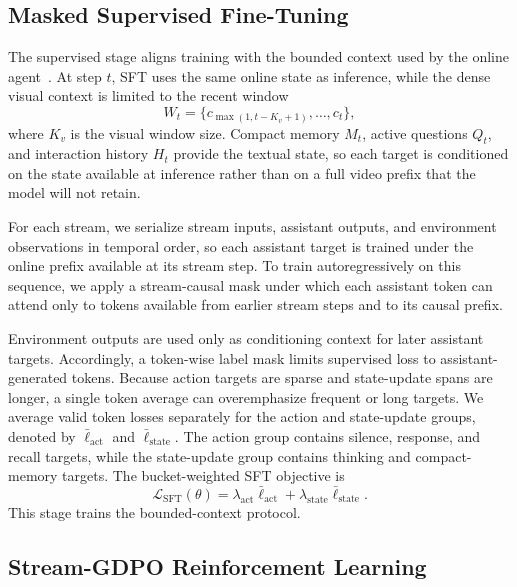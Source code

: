 \subsection{Masked Supervised Fine-Tuning}

The supervised stage aligns training with the bounded context used by the online agent~\citep{streamingvlm2026}.
At step \(t\), SFT uses the same online state as inference, while the dense visual context is limited to the recent window
\begin{equation}
  W_t=\{c_{\max(1,t-K_v+1)},\ldots,c_t\},
\end{equation}
where \(K_v\) is the visual window size.
Compact memory \(M_t\), active questions \(Q_t\), and interaction history \(H_t\) provide the textual state, so each target is conditioned on the state available at inference rather than on a full video prefix that the model will not retain.

For each stream, we serialize stream inputs, assistant outputs, and environment observations in temporal order, so each assistant target is trained under the online prefix available at its stream step.
To train autoregressively on this sequence, we apply a stream-causal mask under which each assistant token can attend only to tokens available from earlier stream steps and to its causal prefix.

Environment outputs are used only as conditioning context for later assistant targets.
Accordingly, a token-wise label mask limits supervised loss to assistant-generated tokens.
Because action targets are sparse and state-update spans are longer, a single token average can overemphasize frequent or long targets.
We average valid token losses separately for the action and state-update groups, denoted by \(\bar\ell_{\mathrm{act}}\) and \(\bar\ell_{\mathrm{state}}\).
The action group contains silence, response, and recall targets, while the state-update group contains thinking and compact-memory targets.
The bucket-weighted SFT objective is
\begin{equation}
  \mathcal L_{\mathrm{SFT}}(\theta)
  =
  \lambda_{\mathrm{act}}\bar\ell_{\mathrm{act}}
  +
  \lambda_{\mathrm{state}}\bar\ell_{\mathrm{state}}.
\end{equation}
This stage trains the bounded-context protocol.



\subsection{Stream-GDPO Reinforcement Learning}

